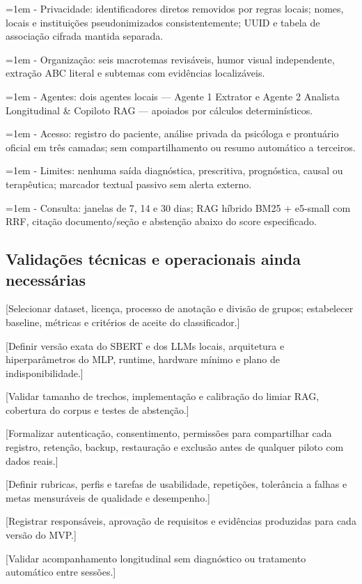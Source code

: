\documentclass[11pt,a4paper]{article}
\newcommand{\pendencia}[1]{\textcolor{pendente}{[#1]}}
\begin{document}
\hangindent=1em - Privacidade: identificadores diretos removidos por regras locais; nomes, locais e instituições pseudonimizados consistentemente; UUID e tabela de associação cifrada mantida separada.

\hangindent=1em - Organização: seis macrotemas revisáveis, humor visual independente, extração ABC literal e subtemas com evidências localizáveis.

\hangindent=1em - Agentes: dois agentes locais — Agente 1 Extrator e Agente 2 Analista Longitudinal \& Copiloto RAG — apoiados por cálculos determinísticos.

\hangindent=1em - Acesso: registro do paciente, análise privada da psicóloga e prontuário oficial em três camadas; sem compartilhamento ou resumo automático a terceiros.

\hangindent=1em - Limites: nenhuma saída diagnóstica, prescritiva, prognóstica, causal ou terapêutica; marcador textual passivo sem alerta externo.

\hangindent=1em - Consulta: janelas de 7, 14 e 30 dias; RAG híbrido BM25 + e5-small com RRF, citação documento/seção e abstenção abaixo do score especificado.

\subsection{Validações técnicas e operacionais ainda necessárias}
\pendencia{Selecionar dataset, licença, processo de anotação e divisão de grupos; estabelecer baseline, métricas e critérios de aceite do classificador.}

\pendencia{Definir versão exata do SBERT e dos LLMs locais, arquitetura e hiperparâmetros do MLP, runtime, hardware mínimo e plano de indisponibilidade.}

\pendencia{Validar tamanho de trechos, implementação e calibração do limiar RAG, cobertura do corpus e testes de abstenção.}

\pendencia{Formalizar autenticação, consentimento, permissões para compartilhar cada registro, retenção, backup, restauração e exclusão antes de qualquer piloto com dados reais.}

\pendencia{Definir rubricas, perfis e tarefas de usabilidade, repetições, tolerância a falhas e metas mensuráveis de qualidade e desempenho.}

\pendencia{Registrar responsáveis, aprovação de requisitos e evidências produzidas para cada versão do MVP.}

\pendencia{Validar acompanhamento longitudinal sem diagnóstico ou tratamento automático entre sessões.}
\end{document}
